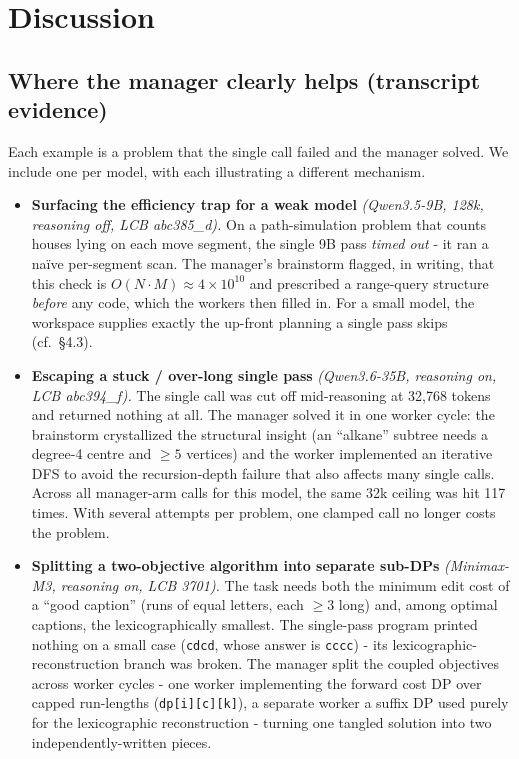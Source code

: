 \documentclass[11pt]{article}
\begin{document}
\section{Discussion}

\subsection{Where the manager clearly helps (transcript evidence)}

Each example is a problem that the single call failed and the manager solved. We include
one per model, with each illustrating a different mechanism.

\begin{itemize}
  \item \textbf{Surfacing the efficiency trap for a weak model} \textit{(Qwen3.5-9B, 128k,
  reasoning off, LCB abc385\_d).} On a path-simulation problem that counts houses lying on
  each move segment, the single 9B pass \textit{timed out} - it ran a na\"ive
  per-segment scan. The manager's brainstorm flagged, in writing, that this check is
  $O(N\cdot M) \approx 4\times10^{10}$ and prescribed a range-query structure
  \textit{before} any code, which the workers then filled in. For a small model, the
  workspace supplies exactly the up-front planning a single pass skips (cf.\ \S4.3).

  \item \textbf{Escaping a stuck / over-long single pass} \textit{(Qwen3.6-35B, reasoning
  on, LCB abc394\_f).} The single call was cut off mid-reasoning at 32,768 tokens and
  returned nothing at all. The manager solved it in one worker cycle: the brainstorm
  crystallized the structural insight (an ``alkane'' subtree needs a degree-4 centre and
  $\ge 5$ vertices) and the worker implemented an iterative DFS to avoid the
  recursion-depth failure that also affects many single calls. Across all manager-arm calls for this model,
  the same 32k ceiling was hit 117 times. With several
  attempts per problem, one clamped call no longer costs the problem.

  \item \textbf{Splitting a two-objective algorithm into separate sub-DPs}
  \textit{(Minimax-M3, reasoning on, LCB 3701).} The task needs both the minimum edit cost
  of a ``good caption'' (runs of equal letters, each $\ge 3$ long) and, among optimal
  captions, the lexicographically smallest. The single-pass program printed nothing on a
  small case (\texttt{cdcd}, whose answer is \texttt{cccc}) - its
  lexicographic-reconstruction branch was broken. The manager split the coupled objectives
  across worker cycles - one worker implementing the forward cost DP over capped
  run-lengths (\texttt{dp[i][c][k]}), a separate worker a suffix DP used purely for the
  lexicographic reconstruction - turning one tangled solution into two
  independently-written pieces.


\end{itemize}
\end{document}

